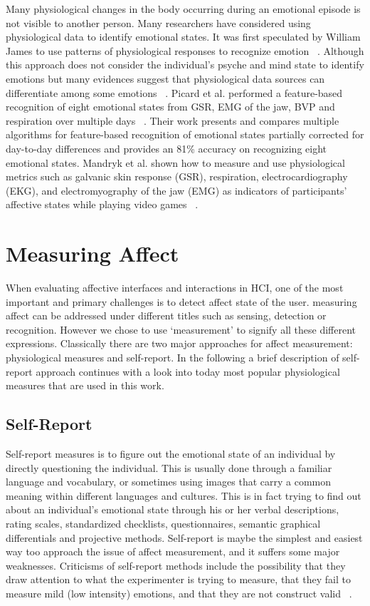 \documentclass{uofsthesis-cs}
\begin{document}
Many physiological changes in the body occurring during an emotional episode is not visible to another person. Many researchers have considered using physiological data to identify emotional states. It was first speculated by William James to use patterns of physiological responses to recognize emotion ~\cite{cacioppo2000psychophysiology}. Although this approach does not consider the individual's psyche and mind state to identify emotions but many evidences suggest that physiological data sources can differentiate among some emotions ~\cite{ekman1983autonomic}. Picard et al. performed a feature-based recognition of eight emotional states from GSR, EMG of the jaw, BVP and respiration over multiple days ~\cite{picard2001toward}. Their work presents and compares multiple algorithms for feature-based recognition of emotional states partially corrected for day-to-day differences and provides an 81\% accuracy on recognizing eight emotional states. Mandryk et al. shown how to measure and use physiological metrics such as galvanic skin response (GSR), respiration, electrocardiography (EKG), and electromyography of the jaw (EMG) as indicators of participants' affective states while playing video games ~\cite{mandryk2007fuzzy}.

\section{Measuring Affect}
When evaluating affective interfaces and interactions in HCI, one of the most important and primary challenges is to detect affect state of the user. measuring affect can be addressed under different titles such as sensing, detection or recognition. However we chose to use `measurement' to signify all these different expressions. Classically there are two major approaches for affect measurement: physiological measures and self-report. In the following a brief description of self-report approach continues with a look into today most popular physiological measures that are used in this work.

\subsection{Self-Report}
Self-report measures is to figure out the emotional state of an individual by directly questioning the individual. This is usually done through a familiar language and vocabulary, or sometimes using images that carry a common meaning within different languages and cultures. This is in fact trying to find out about an individual's emotional state through his or her verbal descriptions, rating scales, standardized checklists, questionnaires, semantic graphical differentials and projective methods. Self-report is maybe the simplest and easiest way too approach the issue of affect measurement, and it suffers some major weaknesses. Criticisms of self-report methods include the possibility that they draw attention to what the experimenter is trying to measure, that they fail to measure mild (low intensity) emotions, and that they are not construct valid ~\cite{isen2007some}.
\end{document}
